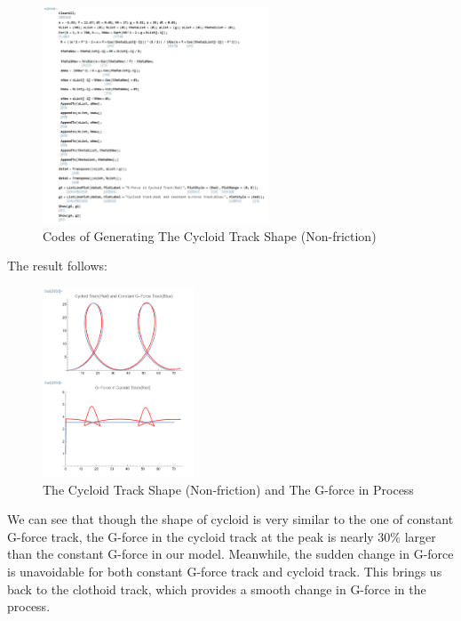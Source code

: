 \documentclass{article}
\begin{document}
\begin{figure}[H]
    \centering
    \includegraphics[width=0.6\textwidth]{8.png}
    \caption{Codes of Generating The Cycloid Track Shape (Non-friction)}
    \end{figure}  


The result follows:

\begin{figure}[H]
    \centering
    \includegraphics[width=0.4\textwidth]{9.png}
    \caption{The Cycloid Track Shape (Non-friction) and The G-force in Process}
    \end{figure}  

We can see that though the shape of cycloid is very similar to the one of constant G-force track, the G-force in the cycloid track at the peak is nearly $30\%$ larger than the constant G-force in our model. Meanwhile, the sudden change in G-force is unavoidable for both constant G-force track and cycloid track. This brings us back to the clothoid track, which provides a smooth change in G-force in the process.
\end{document}
